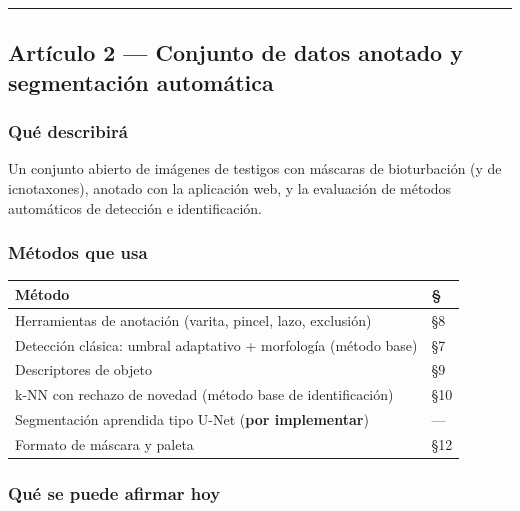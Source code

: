 \documentclass[
  10pt,
]{article}
\begin{document}
\begin{center}\rule{0.5\linewidth}{0.5pt}\end{center}

\hypertarget{artuxedculo-2-conjunto-de-datos-anotado-y-segmentaciuxf3n-automuxe1tica}{%
\subsection{Artículo 2 --- Conjunto de datos anotado y segmentación
automática}\label{artuxedculo-2-conjunto-de-datos-anotado-y-segmentaciuxf3n-automuxe1tica}}

\hypertarget{quuxe9-describiruxe1}{%
\subsubsection{Qué describirá}\label{quuxe9-describiruxe1}}

Un conjunto abierto de imágenes de testigos con máscaras de bioturbación
(y de icnotaxones), anotado con la aplicación web, y la evaluación de
métodos automáticos de detección e identificación.

\hypertarget{muxe9todos-que-usa-1}{%
\subsubsection{Métodos que usa}\label{muxe9todos-que-usa-1}}

\begin{longtable}[]{@{}ll@{}}
\toprule\noalign{}
Método & § \\
\midrule\noalign{}
\endhead
\bottomrule\noalign{}
\endlastfoot
Herramientas de anotación (varita, pincel, lazo, exclusión) & §8 \\
Detección clásica: umbral adaptativo + morfología (método base) & §7 \\
Descriptores de objeto & §9 \\
k-NN con rechazo de novedad (método base de identificación) & §10 \\
Segmentación aprendida tipo U-Net (\textbf{por implementar}) & --- \\
Formato de máscara y paleta & §12 \\
\end{longtable}

\hypertarget{quuxe9-se-puede-afirmar-hoy-1}{%
\subsubsection{Qué se puede afirmar
hoy}\label{quuxe9-se-puede-afirmar-hoy-1}}
\end{document}
